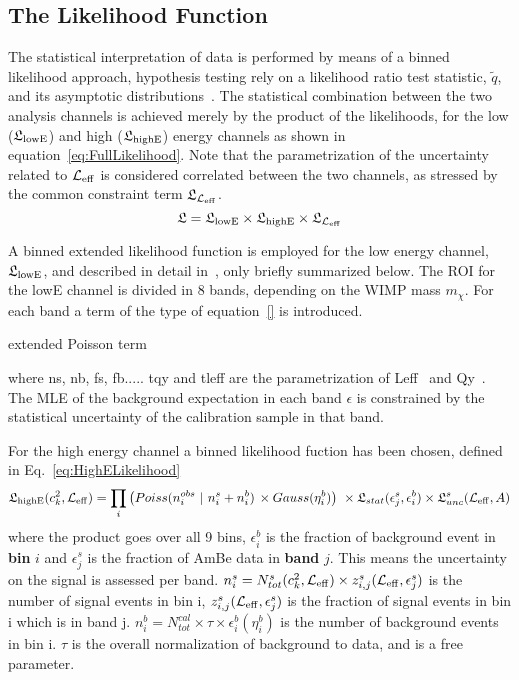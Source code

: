 
\subsection{The Likelihood Function}
\label{sec:LikelihoodFunction}
The statistical interpretation of data is performed by means of a binned likelihood approach, hypothesis testing rely on a likelihood ratio test statistic, $\tilde{q}$, 
and its asymptotic distributions~\cite{asympt}. The statistical combination between the two analysis channels is achieved merely by the product of the likelihoods,
for the low ($\mathfrak{L}_{\mathrm{lowE}}$) and high  ($\mathfrak{L}_{\mathrm{highE}}$) energy channels as shown in equation~\ref{eq:FullLikelihood}. 
Note that the parametrization of the uncertainty related to $\mathcal{L}_{\mathrm{eff}}$  is considered correlated between the two channels, as stressed by the common constraint term $\mathfrak{L}_{\mathcal{L}_{\mathrm{eff}}}$.
\begin{equation}
\label{eq:FullLikelihood}
\mathfrak{L} = \mathfrak{L}_{\mathrm{lowE}} \times \mathfrak{L}_{\mathrm{highE}} \times \mathfrak{L}_{\mathcal{L}_{\mathrm{eff}}}
\end{equation}

A binned extended likelihood function is employed for the low energy channel, $\mathfrak{L}_{\mathrm{lowE}}$, and described in detail in~\cite{xe100_run_combination}, only briefly summarized below.
The ROI for the lowE channel is divided in 8 bands, depending  on the WIMP mass $m_{\chi}$. For each band a term of the type of equation~\ref{} is introduced.

extended Poisson term 

where ns, nb, fs, fb..... tqy and tleff are the parametrization of Leff~\cite{} and Qy~\cite{}. The MLE of the background expectation in each band $\epsilon$ is constrained by the statistical uncertainty 
of the calibration sample in that band.


For the high energy channel a binned likelihood fuction has been chosen, defined in Eq.~\ref{eq:HighELikelihood}
\begin{equation}
\label{eq:HighELikelihood}
\mathfrak{L}_{\mathrm{highE}}(c_k^2,\mathcal{L}_{\mathrm{eff}}) = \prod_{i} \big( Poiss(n^{obs}_{i}~|~n^{s}_{i} + n^{b}_{i}) \, \times Gauss(\eta^{b}_{i}) \big) ~ \times \mathfrak{L}_{stat}(\epsilon^{s}_{j},\epsilon^{b}_{i}) \times \mathfrak{L}^s_{unc}(\mathcal{L}_{\mathrm{eff}}, A)
\end{equation}
where the product goes over all 9 bins, $\epsilon^{b}_{i}$ is the fraction of background event in \textbf{bin} $i$ and  $\epsilon^{s}_{j}$ is the fraction of AmBe data in \textbf{band} $j$. This means the uncertainty on the signal is assessed per band. $n_i^s = N_{tot}^s(c_k^2,\mathcal{L}_{\mathrm{eff}}) \times z_{i,j}^s(\mathcal{L}_{\mathrm{eff}} ,\epsilon^{s}_{j})$ is the number of signal events in bin i, $z_{i,j}^s(\mathcal{L}_{\mathrm{eff}}, \epsilon^{s}_{j})$ is the fraction of signal events in bin i which is in band j. $n_i^b = N_{tot}^{cal} \times \tau \times \epsilon^{b}_{i}(\eta^{b}_{i})$ is the number of background events in bin i. $\tau$ is the overall normalization of background to data, and is a free parameter.  

